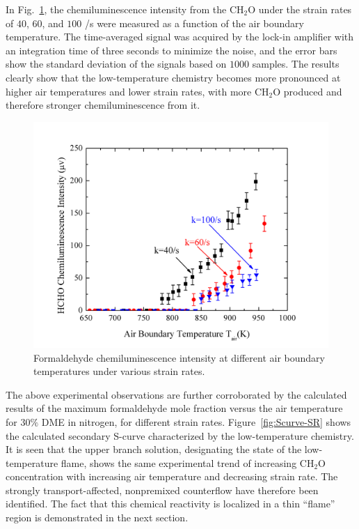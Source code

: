 In Fig.~\ref{fig:PMT}, the chemiluminescence intensity from the CH$_2$O under the strain rates of $40$, $60$, and $100$ /s were measured as a function of the air boundary temperature.  The time-averaged signal was acquired by the lock-in amplifier with an integration time of three seconds to minimize the noise, and the error bars show the standard deviation of the signals based on $1000$ samples. The results clearly show that the low-temperature chemistry becomes more pronounced at higher air temperatures and lower strain rates, with more CH$_2$O produced and therefore stronger chemiluminescence from it.

\begin{figure}[t]
  \centering
  \scriptsize
  \includegraphics[width=1.0\textwidth]{ch-NTC/PMT.png}
  \normalsize
  \caption{Formaldehyde chemiluminescence intensity at different air boundary temperatures under various strain rates.}
  \label{fig:PMT}
\end{figure}

The above experimental observations are further corroborated by the calculated results of the maximum formaldehyde mole fraction versus the air temperature for $30\%$ DME in nitrogen, for different strain rates.  Figure~\ref{fig:Scurve-SR} shows the calculated secondary S-curve characterized by the low-temperature chemistry.  It is seen that the upper branch solution, designating the state of the low-temperature flame, shows the same experimental trend of increasing CH$_2$O concentration with increasing air temperature and decreasing strain rate.  The strongly transport-affected, nonpremixed counterflow have therefore been identified.  The fact that this chemical reactivity is localized in a thin “flame” region is demonstrated in the next section.

